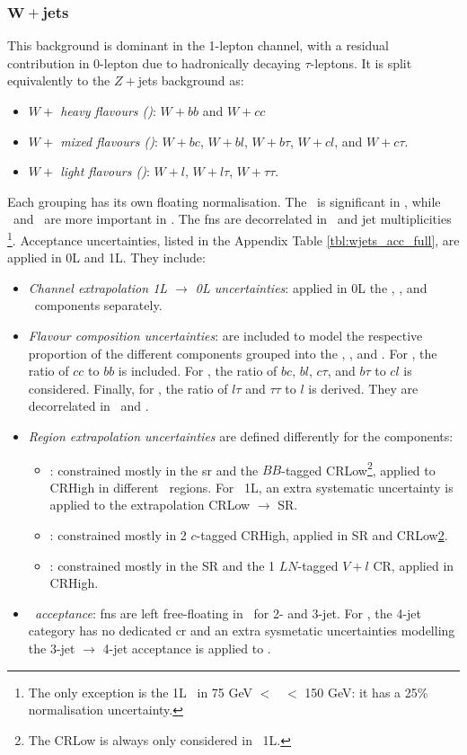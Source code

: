 \subsubsection{$\boldsymbol{W+}$jets}
This background is dominant in the 1-lepton channel, with a residual contribution in 0-lepton due to hadronically decaying $\tau$-leptons. It is split equivalently to the $Z+$jets background as:   
\begin{itemize}
    \item \textit{$W+$ heavy flavours (\whf)}: $W+bb$ and $W+cc$
    \item \textit{$W+$ mixed flavours (\wmf)}: $W+bc$, $W+bl$, $W+b\tau$, $W+cl$, and $W+c\tau$.
    \item \textit{$W+$ light flavours (\wlf)}: $W+l$, $W+l\tau$, $W+\tau\tau$.
\end{itemize}
Each grouping has its own floating normalisation. The \whf\ is significant in \vhb, while \wmf\ and \wlf\ are more important in \vhc. The \glspl{fn} are decorrelated in \ptv\ and jet multiplicities \nj\footnote{The only exception is the 1L \wlf\ in 75 GeV $<$ \ptv\ $<$ 150 GeV: it has a 25\% normalisation uncertainty.}. Acceptance uncertainties, listed in the Appendix Table \ref{tbl:wjets_acc_full}, are applied in 0L and 1L. They include:
\begin{itemize}[leftmargin=*]
    \item \textit{Channel extrapolation 1L $\rightarrow$ 0L uncertainties}: applied in 0L the \whf, \wmf, and \wlf\ components separately. 
    \item \textit{Flavour composition uncertainties}: are included to model the respective proportion of the different components grouped into the \whf, \wmf, and \wlf. For \whf, the ratio of $cc$ to $bb$ is included. For \wmf, the ratio of $bc$, $bl$, $c\tau$, and $b\tau$ to $cl$ is considered. Finally, for  \wlf, the ratio of $l\tau$ and $\tau\tau$ to $l$ is derived. They are decorrelated in \ptv\ and \nj.
    \item \textit{Region extrapolation uncertainties} are defined differently for the components:
    \begin{itemize}
        \item \whf: constrained mostly in the \gls{sr} and the $BB$-tagged CRLow\footnote{\label{footnote-crlow}The CRLow is always only considered in \vhb\ 1L.}, applied to CRHigh in different \ptv\ regions. For \vhb\ 1L, an extra systematic uncertainty is applied to the extrapolation CRLow $\rightarrow$ SR. 
        \item \wmf: constrained mostly in 2 $c$-tagged CRHigh, applied in SR and CRLow\cref{footnote-crlow}.
        \item \wlf: constrained mostly in the SR and the 1 $LN$-tagged $V+l$ CR, applied in CRHigh. 
    \end{itemize}
    \item \textit{\nj\ acceptance}: \glspl{fn} are left free-floating in \nj\ for 2- and 3-jet. For \vhb, the 4-jet category has no dedicated \gls{cr} and an extra sysmetatic uncertainties modelling the 3-jet $\rightarrow$ 4-jet acceptance is applied to \whf.
\end{itemize}
